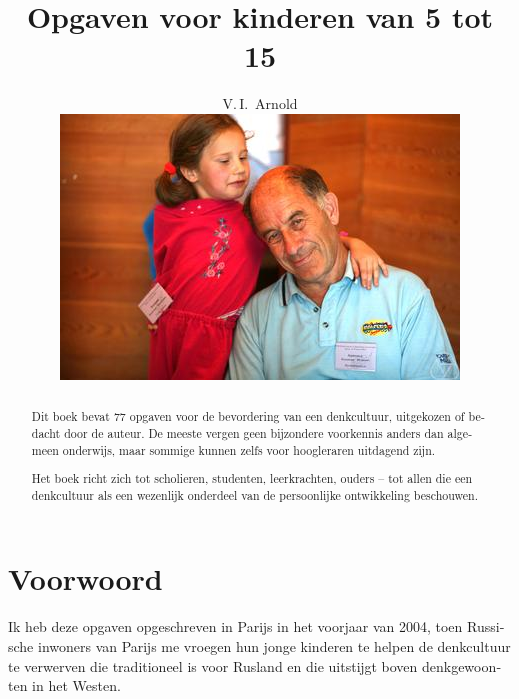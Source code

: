 
\setdefaultlanguage{dutch}
\DeclareSIUnit[number-unit-product=\,]

\title{Opgaven voor kinderen van 5 tot 15}
\author{V.\,I.~Arnold
\vspace*{2cm}\\
\includegraphics[width=\linewidth]{resources/photo-arnold_small}
}
\date{}



\maketitle
\thispagestyle{empty}
\cleardoublepage
\setcounter{page}{1}

\begin{abstract}
	Dit boek bevat 77 opgaven voor de bevordering van een denk\-cultuur, uitgekozen of bedacht door de auteur. De meeste vergen geen bijzondere voorkennis anders dan algemeen onderwijs, maar sommige kunnen zelfs voor hoogleraren uitdagend zijn.

	Het boek richt zich tot scholieren, studenten, leerkrachten, ouders -- tot allen die een denkcultuur als een wezenlijk onderdeel van de persoonlijke ontwikkeling beschouwen.
\end{abstract}

\cleardoublepage

\section*{Voorwoord}
Ik heb deze opgaven opgeschreven in Parijs in het voorjaar van 2004, toen Russische inwoners van Parijs me vroegen hun jonge kinderen te helpen de denkcultuur te verwerven die traditioneel is voor Rusland en die uitstijgt boven denkgewoonten in het Westen.

